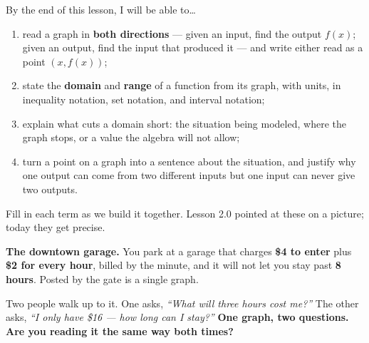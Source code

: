 \documentclass[10pt]{article}
\begin{document}

\vspace{0.15in}

\begin{objectivebox}
\small
By the end of this lesson, I will be able to\dots
\begin{enumerate}[leftmargin=1.5em, itemsep=2pt, topsep=3pt]
  \item read a graph in \textbf{both directions} --- given an input, find the output $f(x)$; given
        an output, find the input that produced it --- and write either read as a point
        $(x, f(x))$;
  \item state the \textbf{domain} and \textbf{range} of a function from its graph, with units, in
        inequality notation, set notation, and interval notation;
  \item explain what cuts a domain short: the situation being modeled, where the graph stops, or a
        value the algebra will not allow;
  \item turn a point on a graph into a sentence about the situation, and justify why one output
        can come from two different inputs but one input can never give two outputs.
\end{enumerate}
\end{objectivebox}

\vspace{0.10in}

\boxguard
\begin{vocabbox}
\small
Fill in each term as we build it together. Lesson 2.0 pointed at these on a picture; today they
get precise.
\end{vocabbox}

\vspace{0.10in}

\boxguard[12]
\begin{hookbox}
\small
\textbf{The downtown garage.} You park at a garage that charges \textbf{\$4 to enter} plus
\textbf{\$2 for every hour}, billed by the minute, and it will not let you stay past
\textbf{8 hours}. Posted by the gate is a single graph.

Two people walk up to it. One asks, \emph{``What will three hours cost me?''} The other asks,
\emph{``I only have \$16 --- how long can I stay?''} \textbf{One graph, two questions. Are you
reading it the same way both times?}

\end{hookbox}
\end{document}
